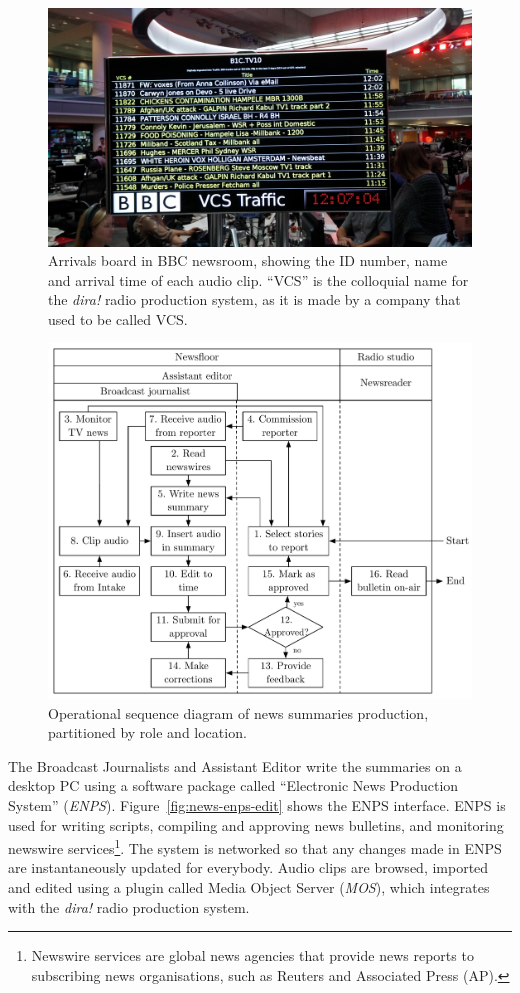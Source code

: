\begin{figure}[p]
  \centering
  \includegraphics[width=\columnwidth]{figs/news-intake-pixelated.jpg}
  \caption[Arrivals board in the BBC newsroom.]{Arrivals board in BBC newsroom, showing the ID number, name and arrival
  time of each audio clip.  ``VCS'' is the colloquial name for the \textit{dira!} radio production system, as it is
  made by a company that used to be called VCS.}
  \label{fig:news-arrivals}
\end{figure}

\begin{figure}[p]
	\centering
	\includegraphics[width=.9\columnwidth]{figs/news-workflow.pdf}
  \caption{Operational sequence diagram of news summaries production, partitioned by role and location.}
	\label{fig:news-flowchart}
\end{figure}


The Broadcast Journalists and Assistant Editor write the summaries on a desktop PC using a software package called
``Electronic News Production System'' (\textit{ENPS}). Figure~\ref{fig:news-enps-edit} shows the ENPS interface. ENPS
is used for writing scripts, compiling and approving news bulletins, and monitoring newswire services\footnote{Newswire
services are global news agencies that provide news reports to subscribing news organisations, such as Reuters and
Associated Press (AP).}. The system is networked so that any changes made in ENPS are instantaneously updated for
everybody. Audio clips are browsed, imported and edited using a plugin called Media Object Server (\textit{MOS}), which
integrates with the \textit{dira!} radio production system.

